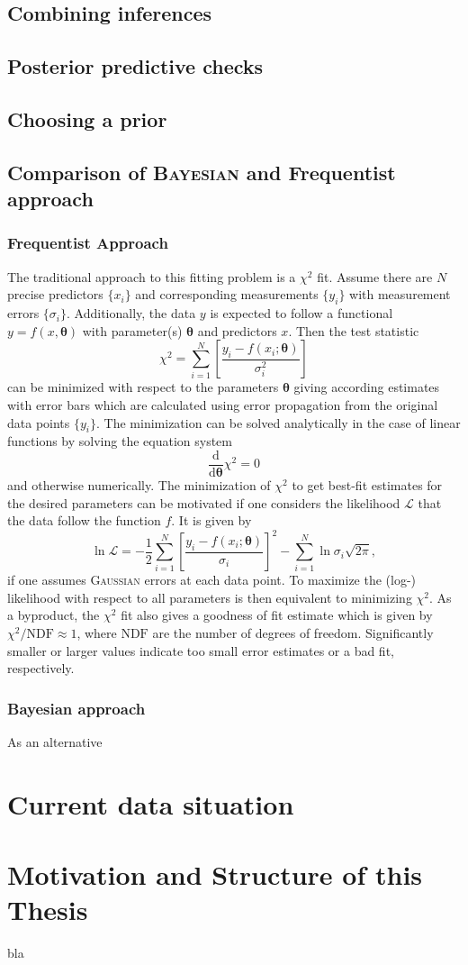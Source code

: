 \subsection{Combining inferences}
\label{subsec:combinf}



\subsection{Posterior predictive checks}

\subsection{Choosing a prior}
\subsection{Comparison of \textsc{Bayesian} and Frequentist approach}
\subsubsection{Frequentist Approach}
The traditional approach to this fitting problem is a $\chi^2$ fit. Assume there are $N$ precise predictors $\{x_i\}$ and corresponding measurements $\{y_i\}$ with measurement errors $\{\sigma_i\}$. Additionally, the data $y$ is expected to follow a functional $y=f(x,\boldsymbol{\theta})$ with parameter(s) $\boldsymbol{\theta}$ and predictors $x$. Then the test statistic \begin{equation}
	\chi^2=\sum_{i=1}^{N}\left[\frac{y_i-f(x_i;\boldsymbol{\theta})}{\sigma_i^2}\right]
\end{equation}
can be minimized with respect to the parameters $\boldsymbol{\theta}$ giving according estimates with error bars which are calculated using error propagation from the original data points $\{y_i\}$. The minimization can be solved analytically in the case of linear functions by solving the equation system $$\frac{\text{d}}{\text{d}\boldsymbol{\theta}}\chi^2=0$$
and otherwise numerically. The minimization of $\chi^2$ to get best-fit estimates for the desired parameters can be motivated if one considers the likelihood $\mathcal{L}$ that the data follow the function $f$. It is given by \begin{equation}
	\ln\mathcal{L}=-\frac{1}{2}\sum_{i=1}^N\left[\frac{y_i-f(x_i;\boldsymbol{\theta})}{\sigma_i}\right]^2-\sum_{i=1}^N\ln\sigma_i\sqrt{2\pi},
\end{equation}
if one assumes \textsc{Gaussian} errors at each data point. To maximize the (log-) likelihood with respect to all parameters is then equivalent to minimizing $\chi^2$. As a byproduct, the $\chi^2$ fit also gives a goodness of fit estimate which is given by $\chi^2/\text{NDF}\approx 1$, where $\text{NDF}$ are the number of degrees of freedom. Significantly smaller or larger values indicate too small error estimates or a bad fit, respectively. \cite{statistics}
\subsubsection{Bayesian approach}
As an alternative
\section{Current data situation}

\section{Motivation and Structure of this Thesis}
bla
